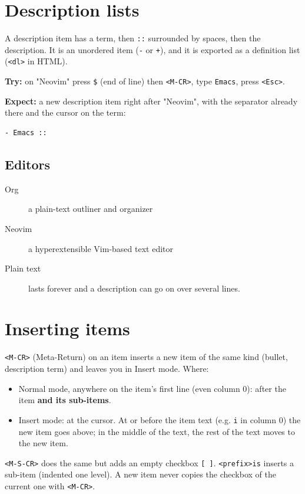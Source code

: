 \section{Description lists}
\label{sec:orge8718bb}
A description item has a term, then \texttt{::} surrounded by spaces, then the
description. It is an unordered item (\texttt{-} or \texttt{+}), and it is exported as a
definition list (\texttt{<dl>} in HTML).

\textbf{Try:} on "Neovim" press \texttt{\$} (end of line) then \texttt{<M-CR>}, type \texttt{Emacs},
press \texttt{<Esc>}.

\textbf{Expect:} a new description item right after "Neovim", with the separator
already there and the cursor on the term:
\begin{verbatim}
- Emacs ::
\end{verbatim}
\subsection{Editors}
\label{sec:orgc5d4884}
\begin{description}
\item[{Org}] a plain-text outliner and organizer
\item[{Neovim}] a hyperextensible Vim-based text editor
\item[{Plain text}] lasts forever
and a description can go on over
several lines.
\end{description}
\section{Inserting items}
\label{sec:orgbdb4163}
\texttt{<M-CR>} (Meta-Return) on an item inserts a new item of the same kind
(bullet, description term) and leaves you in Insert mode. Where:
\begin{itemize}
\item Normal mode, anywhere on the item's first line (even column 0): after
the item \textbf{and its sub-items}.
\item Insert mode: at the cursor. At or before the item text (e.g. \texttt{i} in
column 0) the new item goes above; in the middle of the text, the rest of
the text moves to the new item.
\end{itemize}

\texttt{<M-S-CR>} does the same but adds an empty checkbox \texttt{[ ]}. \texttt{<prefix>is}
inserts a sub-item (indented one level). A new item never copies the
checkbox of the current one with \texttt{<M-CR>}.

